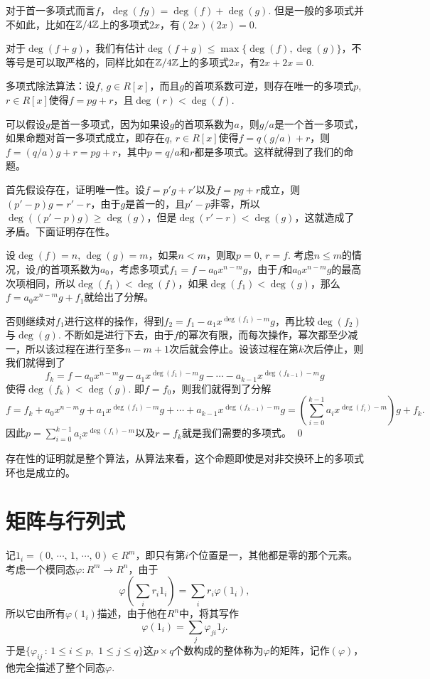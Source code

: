 对于首一多项式而言$f$，$\deg(fg)=\deg(f)+\deg(g)$. 但是一般的多项式并不如此，比如在$\mathbb{Z}/4\mathbb{Z}$上的多项式$2x$，有$(2x)(2x)=0$.

对于$\deg(f+g)$，我们有估计$\deg(f+g)\leq \max\{\deg(f),\deg(g)\}$，不等号是可以取严格的，同样比如在$\mathbb{Z}/4\mathbb{Z}$上的多项式$2x$，有$2x+2x=0$.

\theo 多项式除法算法：设$f$, $g\in R[x]$，而且$g$的首项系数可逆，则存在唯一的多项式$p$, $r\in R[x]$使得$f=pg+r$，且$\deg(r)<\deg(f)$.

\proof
	可以假设$g$是首一多项式，因为如果设$g$的首项系数为$a$，则$g/a$是一个首一多项式，如果命题对首一多项式成立，即存在$q$, $r\in R[x]$使得$f=q(g/a)+r$，则$f=(q/a)g+r=pg+r$，其中$p=q/a$和$r$都是多项式。这样就得到了我们的命题。

	首先假设存在，证明唯一性。设$f=p'g+r'$以及$f=pg+r$成立，则$(p'-p)g=r'-r$，由于$g$是首一的，且$p'-p$非零，所以$\deg((p'-p)g)\geq \deg(g)$，但是$\deg(r'-r)< \deg(g)$，这就造成了矛盾。下面证明存在性。

	设$\deg(f)=n$, $\deg(g)=m$，如果$n<m$，则取$p=0$, $r=f$. 考虑$n\leq m$的情况，设$f$的首项系数为$a_0$，考虑多项式$f_1=f-a_0x^{n-m}g$，由于$f$和$a_0x^{n-m}g$的最高次项相同，所以$\deg(f_1)<\deg(f)$，如果$\deg(f_1)<\deg(g)$，那么$f=a_0x^{n-m}g+f_1$就给出了分解。

	否则继续对$f_1$进行这样的操作，得到$f_2=f_1-a_1x^{\deg(f_1)-m}g$，再比较$\deg(f_2)$与$\deg(g)$. 不断如是进行下去，由于$f$的幂次有限，而每次操作，幂次都至少减一，所以该过程在进行至多$n-m+1$次后就会停止。设该过程在第$k$次后停止，则我们就得到了
	\[
	f_{k}=f-a_0x^{n-m}g-a_1x^{\deg(f_1)-m}g-\cdots-a_{k-1}x^{\deg(f_{k-1})-m}g
	\]
	使得$\deg(f_k)< \deg(g)$. 即$f=f_0$，则我们就得到了分解
	\[
	f=f_k+a_0x^{n-m}g+a_1x^{\deg(f_1)-m}g+\cdots+a_{k-1}x^{\deg(f_{k-1})-m}g=\left(\sum_{i=0}^{k-1}a_{i}x^{\deg(f_{i})-m}\right)g+f_k.
	\]
	因此$p=\sum_{i=0}^{k-1}a_{i}x^{\deg(f_{i})-m}$以及$r=f_k$就是我们需要的多项式。
\qed

存在性的证明就是整个算法，从算法来看，这个命题即使是对非交换环上的多项式环也是成立的。

\section{矩阵与行列式}

\para 记$1_i=(0,\,\cdots\!,\,1,\,\cdots\!,\,0)\in R^m$，即只有第$i$个位置是一，其他都是零的那个元素。考虑一个模同态$\varphi:R^m\to R^n$，由于
\[
	\varphi\left(\sum_{i} r_i1_i\right)=\sum_{i} r_i\varphi\left(1_i\right),
\]
所以它由所有$\varphi\left(1_i\right)$描述，由于他在$R^n$中，将其写作
\[
	\varphi\left(1_i\right)=\sum_{j}\varphi_{ji}1_j.
\]
于是$\{\varphi_{ij}\,:\, 1\leq i \leq p,\,\,1\leq j \leq q\}$这$p\times q$个数构成的整体称为$\varphi$的矩阵，记作$(\varphi)$，他完全描述了整个同态$\varphi$.

